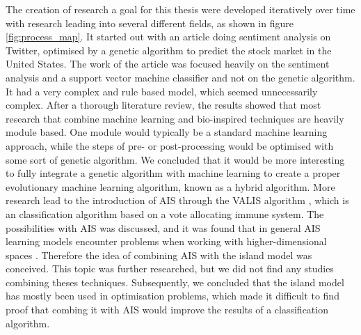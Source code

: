 The creation of research a goal for this thesis were developed iteratively over time with research leading into several different fields, as shown in figure \ref{fig:process_map}. It started out with an article \cite{process:twitter-sentiment-ga} doing sentiment analysis on Twitter, optimised by a genetic algorithm to predict the stock market in the United States. The work of the article was focused heavily on the sentiment analysis and a support vector machine classifier and not on the genetic algorithm. It had a very complex and rule based model, which seemed unnecessarily complex. After a thorough literature review, the results showed that most research that combine machine learning and bio-inspired techniques are heavily module based.
One module would typically be a standard machine learning approach, while the steps of pre- or post-processing would be optimised with some sort of genetic algorithm. We concluded that it would be more interesting to fully integrate a genetic algorithm with machine learning to create a proper evolutionary machine learning algorithm, known as a hybrid algorithm. More research lead to the introduction of AIS through the VALIS algorithm \cite{process:valis}, which is an classification algorithm based on a vote allocating immune system. The possibilities with AIS was discussed, and it was found that in general AIS learning models encounter problems when working with higher-dimensional spaces \cite{AIS:representation-in-ais}.
Therefore the idea of combining AIS with the island model was conceived. This topic was further researched, but we did not find any studies combining theses techniques. Subsequently, we concluded that the island model has mostly been used in optimisation problems, which made it difficult to find proof that combing it with AIS would improve the results of a classification algorithm. 

